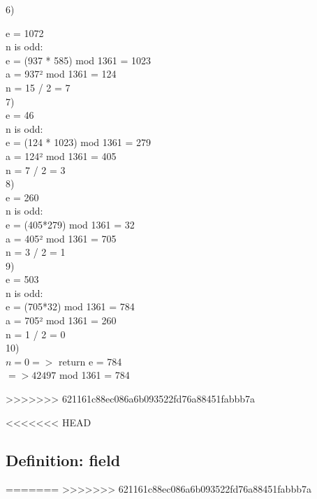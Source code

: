 6)

e = 1072\\
n is odd:\\
e = (937 * 585) mod 1361 = 1023\\
a = 937² mod 1361 = 124\\
n = 15 / 2 = 7\\

7)\\

e = 46\\
n is odd:\\
e = (124 * 1023) mod 1361 = 279\\
a = 124² mod 1361 = 405\\
n = 7 / 2 = 3\\

8)\\

e = 260\\
n is odd:\\
e = (405*279) mod 1361 = 32\\
a = 405² mod 1361 = 705\\
n = 3 / 2 = 1\\

9)\\

e = 503\\
n is odd:\\
e = (705*32) mod 1361 = 784\\
a = 705² mod 1361 = 260\\
n = 1 / 2 = 0\\

10)\\

$n = 0 =>$ return e = 784\\

$=> 42497$ mod 1361 = 784



>>>>>>> 621161c88ec086a6b093522fd76a88451fabbb7a




<<<<<<< HEAD
\subsection{Definition: field}
=======
>>>>>>> 621161c88ec086a6b093522fd76a88451fabbb7a
